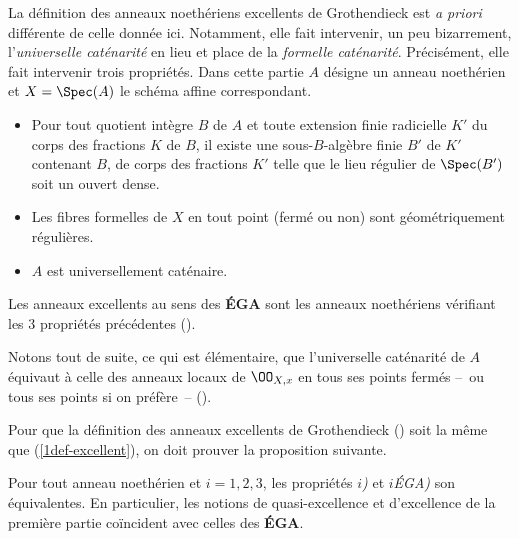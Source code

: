 \documentclass[10pt]{../fichiers-configuration-latex/smfart}
\begin{document}
La définition des anneaux noethériens excellents de Grothendieck est \textit{a priori} différente de
celle donnée ici. Notamment, elle fait intervenir, un peu bizarrement, l'\emph{universelle
caténarité} en lieu et place de la \emph{formelle caténarité}. Précisément, elle fait intervenir
trois propriétés. Dans cette partie $A$ désigne un anneau noethérien et $X=\Spec(A)$ le schéma
affine correspondant.

\begin{itemize} \item [1EGA)] Pour tout quotient intègre $B$ de $A$ et toute extension finie
radicielle $K'$ du corps des fractions $K$ de $B$, il existe une sous-$B$-algèbre finie $B'$ de $K'$
contenant $B$, de corps des fractions $K'$ telle que le lieu régulier de $\Spec(B')$ soit un ouvert
dense.  \item [2EGA)] Les fibres formelles de $X$ en tout point (fermé ou non) sont géométriquement
régulières.  \item [3EGA)] $A$ est universellement caténaire.  \end{itemize}

Les anneaux excellents au sens des \textbf{ÉGA} sont les anneaux noethériens vérifiant les 3
propriétés précédentes ().

Notons tout de suite, ce qui est élémentaire, que l'universelle caténarité de $A$ équivaut à celle
des anneaux locaux de $\OO_{X,x}$ en tous ses points fermés -- ou tous ses points si on préfère --
().



Pour que la définition des anneaux excellents de Grothendieck () soit la même que
(\ref{1def-excellent}), on doit prouver la proposition suivante.

\begin{proposition}\label{1equi-excellent}Pour tout anneau noethérien et $i=1,2,3$, les propriétés
$i$\emph{)} et $i$\emph{ÉGA)} son équivalentes. En particulier, les notions de quasi-excellence et
d'excellence de la première partie coïncident avec celles des \textbf{ÉGA}.\end{proposition}
\end{document}
